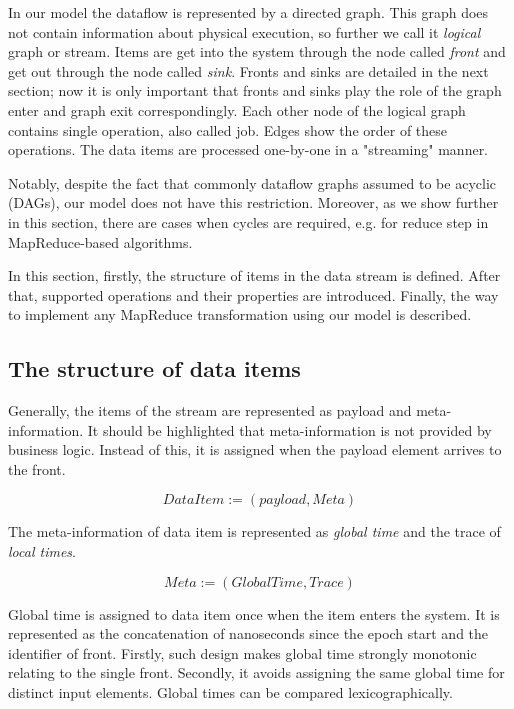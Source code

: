 
\label {fs-model-section}
In our model the dataflow is represented by a directed graph. This graph does not contain information about physical execution, so further we call it {\it logical} graph or stream. Items are get into the system through the node called {\it front} and get out through the node called {\it sink}. Fronts and sinks are detailed in the next section; now it is only important that fronts and sinks play the role of the graph enter and graph exit correspondingly. Each other node of the logical graph contains single operation, also called job. Edges show the order of these operations. The data items are processed one-by-one in a "streaming" manner. 

Notably, despite the fact that commonly dataflow graphs assumed to be acyclic (DAGs), our model does not have this restriction. Moreover, as we show further in this section, there are cases when cycles are required, e.g. for reduce step in MapReduce-based algorithms. 

In this section, firstly, the structure of items in the data stream is defined. After that, supported operations and their properties are introduced. Finally, the way to implement any MapReduce transformation using our model is described.

\subsection{The structure of data items}
Generally, the items of the stream are represented as payload and meta-information. It should be highlighted that meta-information is not provided by business logic. Instead of this, it is assigned when the payload element arrives to the front. 

\[DataItem := (payload, Meta)\]

The meta-information of data item is represented as {\it global time} and the trace of {\it local times}.

\[Meta := (GlobalTime, Trace)\]

Global time is assigned to data item once when the item enters the system. It is represented as the concatenation of nanoseconds since the epoch start and the identifier of front. Firstly, such design makes global time strongly monotonic relating to the single front. Secondly, it avoids assigning the same global time for distinct input elements. Global times can be compared lexicographically.

